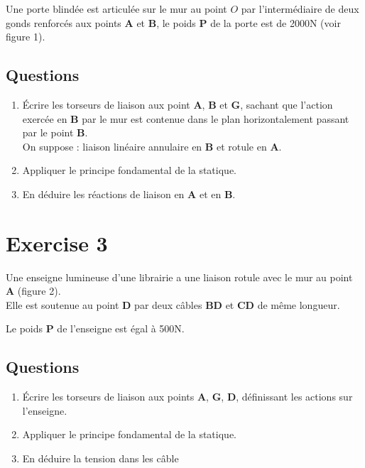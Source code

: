 \documentclass[
]{book}
\providecommand{\tightlist}{%
  \setlength{\itemsep}{0pt}\setlength{\parskip}{0pt}}
\begin{document}
Une porte blindée est articulée sur le mur au point \(O\) par l'intermédiaire de deux gonds renforcés aux points \textbf{A} et \textbf{B}, le poids \textbf{P} de la porte est de 2000N (voir figure 1).

\hypertarget{questions-1}{%
\subsection*{Questions}\label{questions-1}}

\begin{enumerate}
\def\labelenumi{\arabic{enumi}.}
\item
  Écrire les torseurs de liaison aux point \textbf{A}, \textbf{B} et \textbf{G}, sachant que l'action exercée en \textbf{B} par le mur est contenue dans le plan horizontalement passant par le point \textbf{B}.\\
  On suppose : liaison linéaire annulaire en \textbf{B} et rotule en \textbf{A}.
\item
  Appliquer le principe fondamental de la statique.
\item
  En déduire les réactions de liaison en \textbf{A} et en \textbf{B}.
\end{enumerate}

\hypertarget{exercise-3}{%
\section{Exercise 3}\label{exercise-3}}

Une enseigne lumineuse d'une librairie a une liaison rotule avec le mur au point \textbf{A} (figure 2).\\
Elle est soutenue au point \textbf{D} par deux câbles \textbf{BD} et \textbf{CD} de même longueur.

Le poids \textbf{P} de l'enseigne est égal à 500N.

\hypertarget{questions-2}{%
\subsection*{Questions}\label{questions-2}}

\begin{enumerate}
\def\labelenumi{\arabic{enumi}.}
\tightlist
\item
  Écrire les torseurs de liaison aux points \textbf{A}, \textbf{G}, \textbf{D}, définissant les actions sur l'enseigne.
\item
  Appliquer le principe fondamental de la statique.
\item
  En déduire la tension dans les câble
\end{enumerate}
\end{document}
